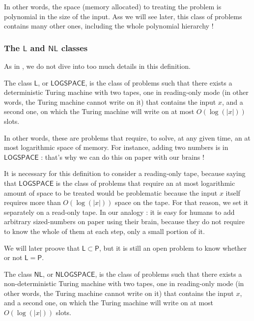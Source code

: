 In other words, the space (memory allocated) to treating the problem is polynomial in the size of the input. Ass we will see later, this class of problems contains many other ones, including the whole polynomial hierarchy !

\subsubsection{The $ \mathsf L $ and $ \mathsf{NL} $ classes}

As in \cite{gowers2024}, we do not dive into too much details in this definition.

\begin{definition}[$ \mathsf L $]
    The class $ \mathsf{L} $, or $ \mathsf{LOGSPACE} $, is the class of problems such that there exists a deterministic Turing machine with two tapes, one in \og reading-only \fg mode (in other words, the Turing machine cannot write on it) that contains the input $ x $, and a second one, on which the Turing machine will write on at most $ O(\log(|x|)) $ slots.
\end{definition}

In other words, these are problems that require, to solve, at any given time, an at most logarithmic space of memory. For instance, adding two numbers is in $ \mathsf{LOGSPACE} $ : that's why we can do this on paper with our brains !

It is necessary for this definition to consider a reading-only tape, because saying that \og $ \mathsf{LOGSPACE} $ is the class of problems that require an at most logarithmic amount of space to be treated \fg would be problematic because the input $ x $ itself requires more than $ O(\log(|x|)) $ space on the tape. For that reason, we set it separately on a read-only tape. In our analogy : it is easy for humans to add arbitrary sized-numbers on paper using their brain, because they do not require to know the whole of them at each step, only a small portion of it.

We will later proove that $ \mathsf L \subset \mathsf P $, but it is still an open problem to know whether or not $ \mathsf L = \mathsf P $.

\begin{definition}[$ \mathsf{NL} $]
    The class $ \mathsf{NL} $, or $ \mathsf{NLOGSPACE} $, is the class of problems such that there exists a non-deterministic Turing machine with two tapes, one in \og reading-only \fg mode (in other words, the Turing machine cannot write on it) that contains the input $ x $, and a second one, on which the Turing machine will write on at most $ O(\log(|x|)) $ slots.
\end{definition}

